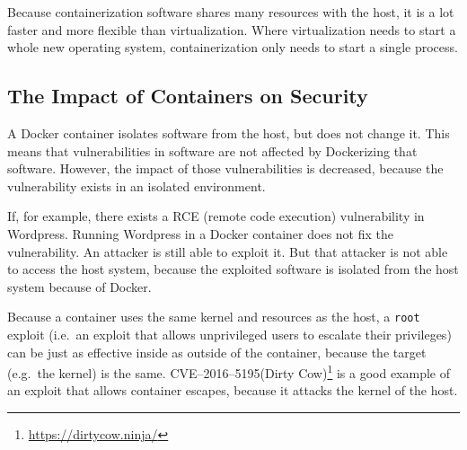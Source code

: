
Because containerization software shares many resources with the host, it is a lot faster and more flexible than virtualization. Where virtualization needs to start a whole new operating system, containerization only needs to start a single process.

\subsection{The Impact of Containers on Security}
A Docker container isolates software from the host, but does not change it. This means that vulnerabilities in software are not affected by Dockerizing that software. However, the impact of those vulnerabilities is decreased, because the vulnerability exists in an isolated environment.

If, for example, there exists a RCE (remote code execution) vulnerability in Wordpress. Running Wordpress in a Docker container does not fix the vulnerability. An attacker is still able to exploit it. But that attacker is not able to access the host system, because the exploited software is isolated from the host system because of Docker.

\medskip

Because a container uses the same kernel and resources as the host, a \lstinline{root} exploit (i.e.\ an exploit that allows unprivileged users to escalate their privileges) can be just as effective inside as outside of the container, because the target (e.g.\ the kernel) is the same. CVE--2016--5195(Dirty Cow)\footnote{\url{https://dirtycow.ninja/}} is a good example of an exploit that allows container escapes\cite{Dirty-Cow-Escape}, because it attacks the kernel of the host.
